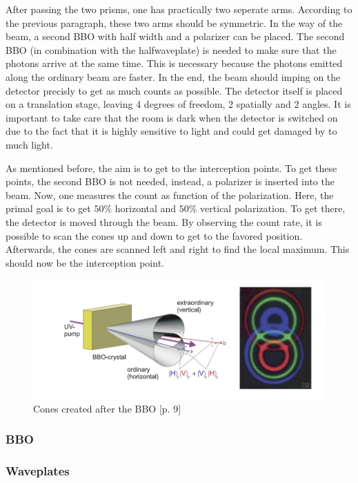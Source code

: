 \documentclass[12pt,a4paper]{article}
\begin{document}
\begin{multicols}{2}
 
 After passing the two prisms, one has practically two seperate arms. According to the previous paragraph, these two arms should be symmetric. In the way of the beam, a second BBO with half width and a polarizer can be placed. The second BBO (in combination with the halfwaveplate) is needed to make sure that the photons arrive at the same time. This is necessary because the photons emitted along the ordinary beam are faster. In the end, the beam should imping on the detector precisly to get as much counts as possible. The detector itself is placed on a translation stage, leaving 4 degrees of freedom, 2 spatially and 2 angles. It is important to take care that the room is dark when the detector is switched on due to the fact that it is highly sensitive to light and could get damaged by to much light.
 
 As mentioned before, the aim is to get to the interception points. To get these points, the second BBO is not needed, instead, a polarizer is inserted into the beam. Now, one measures the count as function of the polarization. Here, the primal goal is to get $50\%$ horizontal and $50\%$ vertical polarization. To get there, the detector is moved through the beam. By observing the count rate, it is possible to scan the cones up and down to get to the favored position. Afterwards, the cones are scanned left and right to find the local maximum. This should now be the interception point.
 
 




\begin{figure}[H]
 \centering
 \includegraphics[scale=0.7]{./figures/cones.png}
 \caption{Cones created after the BBO \cite{physikwiki}[p. 9]}
 \label{fig:cones}
\end{figure}

\subsubsection{BBO}
\subsubsection{Waveplates}

\end{multicols}
\end{document}
